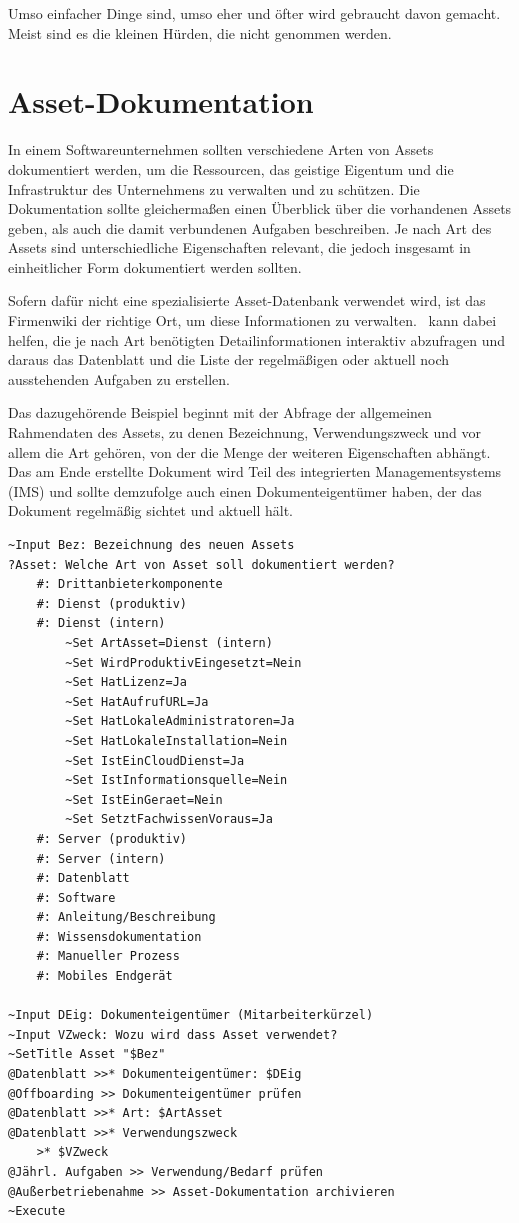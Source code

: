 Umso einfacher Dinge sind, umso eher und öfter wird gebraucht davon gemacht. Meist sind es die kleinen Hürden, die nicht genommen werden.

\section{Asset-Dokumentation}\label{AssetDokumentation}
In einem Softwareunternehmen sollten verschiedene Arten von Assets dokumentiert werden, um die Ressourcen, das geistige Eigentum und die Infrastruktur des Unternehmens zu verwalten und zu schützen. Die Dokumentation sollte gleichermaßen einen Überblick über die vorhandenen Assets geben, als auch die damit verbundenen Aufgaben beschreiben. Je nach Art des Assets sind unterschiedliche Eigenschaften relevant, die jedoch insgesamt in einheitlicher Form dokumentiert werden sollten.

Sofern dafür nicht eine spezialisierte Asset-Datenbank verwendet wird, ist das Firmenwiki der richtige Ort, um diese Informationen zu verwalten. \FPZ\ kann dabei helfen, die je nach Art benötigten Detailinformationen interaktiv abzufragen und daraus das Datenblatt und die Liste der regelmäßigen oder aktuell noch ausstehenden Aufgaben zu erstellen.

Das dazugehörende Beispiel beginnt mit der Abfrage der allgemeinen Rahmendaten des Assets, zu denen Bezeichnung, Verwendungszweck und vor allem die Art gehören, von der die Menge der weiteren Eigenschaften abhängt. Das am Ende erstellte Dokument wird Teil des integrierten Managementsystems (IMS) und sollte demzufolge auch einen Dokumenteigentümer haben, der das Dokument regelmäßig sichtet und aktuell hält.

\label{BspAsset1}
\begin{verbatim}
~Input Bez: Bezeichnung des neuen Assets
?Asset: Welche Art von Asset soll dokumentiert werden?        
    #: Drittanbieterkomponente
    #: Dienst (produktiv)
    #: Dienst (intern)
        ~Set ArtAsset=Dienst (intern)
        ~Set WirdProduktivEingesetzt=Nein        
        ~Set HatLizenz=Ja
        ~Set HatAufrufURL=Ja
        ~Set HatLokaleAdministratoren=Ja
        ~Set HatLokaleInstallation=Nein
        ~Set IstEinCloudDienst=Ja
        ~Set IstInformationsquelle=Nein
        ~Set IstEinGeraet=Nein
        ~Set SetztFachwissenVoraus=Ja
    #: Server (produktiv)
    #: Server (intern)    
    #: Datenblatt
    #: Software
    #: Anleitung/Beschreibung
    #: Wissensdokumentation
    #: Manueller Prozess
    #: Mobiles Endgerät

~Input DEig: Dokumenteigentümer (Mitarbeiterkürzel)
~Input VZweck: Wozu wird dass Asset verwendet?
~SetTitle Asset "$Bez"
@Datenblatt >>* Dokumenteigentümer: $DEig
@Offboarding >> Dokumenteigentümer prüfen
@Datenblatt >>* Art: $ArtAsset
@Datenblatt >>* Verwendungszweck
    >* $VZweck
@Jährl. Aufgaben >> Verwendung/Bedarf prüfen
@Außerbetriebenahme >> Asset-Dokumentation archivieren
~Execute
\end{verbatim}

